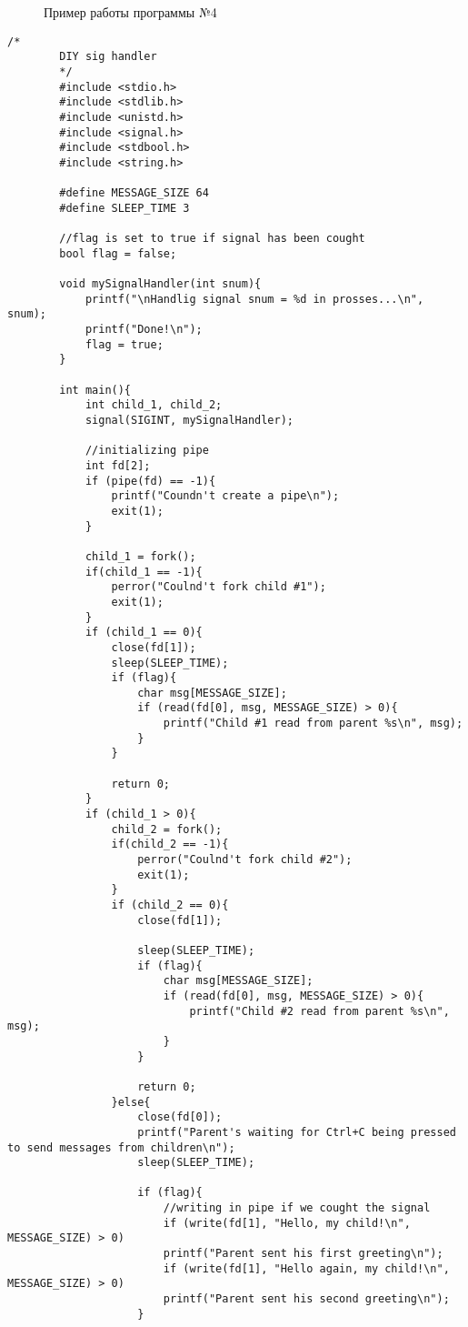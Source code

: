 \documentclass[12pt]{report}
\begin{document}
	\begin{figure}[H]
		\caption{Пример работы программы №4}
		\label{ris:task4}
	\end{figure}
	\newpage
	\begin{lstlisting}[label=five,caption = Установка своего обработчика сигнала, style = CStyle]
		/*
		DIY sig handler
		*/
		#include <stdio.h>
		#include <stdlib.h>
		#include <unistd.h>
		#include <signal.h>
		#include <stdbool.h>
		#include <string.h>
		
		#define MESSAGE_SIZE 64
		#define SLEEP_TIME 3
		
		//flag is set to true if signal has been cought
		bool flag = false;
		
		void mySignalHandler(int snum){
			printf("\nHandlig signal snum = %d in prosses...\n", snum);
			printf("Done!\n");
			flag = true;
		}
		
		int main(){
			int child_1, child_2;
			signal(SIGINT, mySignalHandler);
			
			//initializing pipe
			int fd[2];
			if (pipe(fd) == -1){
				printf("Coundn't create a pipe\n");
				exit(1);
			}
			
			child_1 = fork();
			if(child_1 == -1){
				perror("Coulnd't fork child #1");
				exit(1);
			}
			if (child_1 == 0){
				close(fd[1]);
				sleep(SLEEP_TIME);
				if (flag){
					char msg[MESSAGE_SIZE];
					if (read(fd[0], msg, MESSAGE_SIZE) > 0){
						printf("Child #1 read from parent %s\n", msg);
					}
				}
				
				return 0;
			}
			if (child_1 > 0){
				child_2 = fork();
				if(child_2 == -1){
					perror("Coulnd't fork child #2");
					exit(1);
				}
				if (child_2 == 0){
					close(fd[1]);
					
					sleep(SLEEP_TIME);
					if (flag){
						char msg[MESSAGE_SIZE];
						if (read(fd[0], msg, MESSAGE_SIZE) > 0){
							printf("Child #2 read from parent %s\n", msg);
						}
					}
					
					return 0;
				}else{
					close(fd[0]);
					printf("Parent's waiting for Ctrl+C being pressed to send messages from children\n");
					sleep(SLEEP_TIME);
					
					if (flag){
						//writing in pipe if we cought the signal
						if (write(fd[1], "Hello, my child!\n", MESSAGE_SIZE) > 0)
						printf("Parent sent his first greeting\n");
						if (write(fd[1], "Hello again, my child!\n", MESSAGE_SIZE) > 0)
						printf("Parent sent his second greeting\n");
					}
					

\end{lstlisting}
\end{document}
